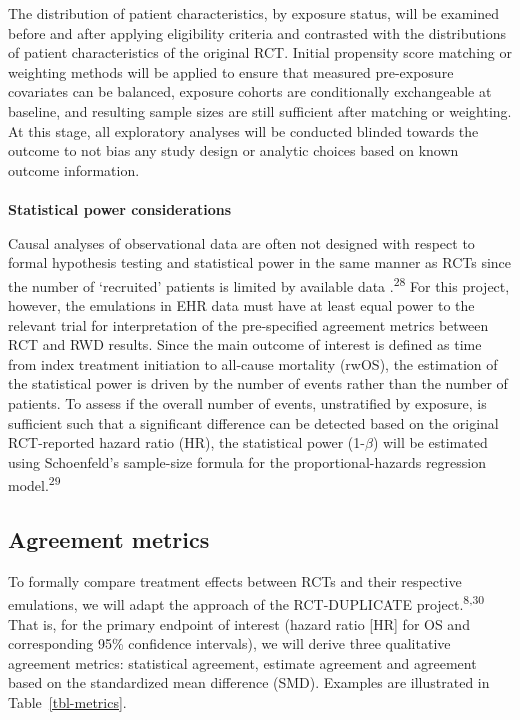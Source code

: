 \documentclass[
  letterpaper,
  DIV=11,
  numbers=noendperiod]{scrartcl}
\makeatletter
\let\oldparagraph\paragraph
\renewcommand{\paragraph}{
    \@ifstar
      \xxxParagraphStar
      \xxxParagraphNoStar
  }
\newcommand{\xxxParagraphStar}[1]{\oldparagraph*{#1}\mbox{}}
\newcommand{\xxxParagraphNoStar}[1]{\oldparagraph{#1}\mbox{}}
\makeatother
\begin{document}
The distribution of patient characteristics, by exposure status, will be
examined before and after applying eligibility criteria and contrasted
with the distributions of patient characteristics of the original RCT.
Initial propensity score matching or weighting methods will be applied
to ensure that measured pre-exposure covariates can be balanced,
exposure cohorts are conditionally exchangeable at baseline, and
resulting sample sizes are still sufficient after matching or weighting.
At this stage, all exploratory analyses will be conducted blinded
towards the outcome to not bias any study design or analytic choices
based on known outcome information.

\paragraph{\texorpdfstring{\textbf{Statistical power
considerations}}{Statistical power considerations}}\label{statistical-power-considerations}

Causal analyses of observational data are often not designed with
respect to formal hypothesis testing and statistical power in the same
manner as RCTs since the number of `recruited' patients is limited by
available data .\textsuperscript{28} For this project, however, the
emulations in EHR data must have at least equal power to the relevant
trial for interpretation of the pre-specified agreement metrics between
RCT and RWD results. Since the main outcome of interest is defined as
time from index treatment initiation to all-cause mortality (rwOS), the
estimation of the statistical power is driven by the number of events
rather than the number of patients. To assess if the overall number of
events, unstratified by exposure, is sufficient such that a significant
difference can be detected based on the original RCT-reported hazard
ratio (HR), the statistical power (1-\(\beta\)) will be estimated using
Schoenfeld's sample-size formula for the proportional-hazards regression
model.\textsuperscript{29}

\subsection{Agreement metrics}\label{sec-agreement-metrics}

To formally compare treatment effects between RCTs and their respective
emulations, we will adapt the approach of the RCT-DUPLICATE
project.\textsuperscript{8,30} That is, for the primary endpoint of
interest (hazard ratio {[}HR{]} for OS and corresponding 95\% confidence
intervals), we will derive three qualitative agreement metrics:
statistical agreement, estimate agreement and agreement based on the
standardized mean difference (SMD). Examples are illustrated in
Table~\ref{tbl-metrics}.
\end{document}
